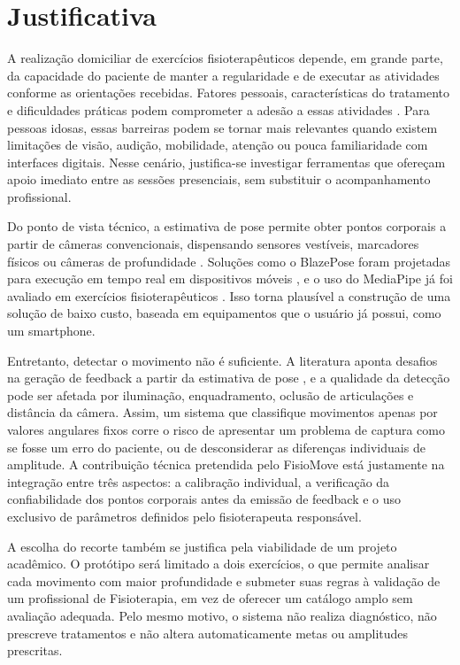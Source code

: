 
\section{Justificativa}
\label{sec:justificativa}

A realização domiciliar de exercícios fisioterapêuticos depende, em grande parte, da capacidade do paciente de manter a regularidade e de executar as atividades conforme as orientações recebidas. Fatores pessoais, características do tratamento e dificuldades práticas podem comprometer a adesão a essas atividades \cite{Jack2010}. Para pessoas idosas, essas barreiras podem se tornar mais relevantes quando existem limitações de visão, audição, mobilidade, atenção ou pouca familiaridade com interfaces digitais. Nesse cenário, justifica-se investigar ferramentas que ofereçam apoio imediato entre as sessões presenciais, sem substituir o acompanhamento profissional.

Do ponto de vista técnico, a estimativa de pose permite obter pontos corporais a partir de câmeras convencionais, dispensando sensores vestíveis, marcadores físicos ou câmeras de profundidade \cite{debnath2022}. Soluções como o BlazePose foram projetadas para execução em tempo real em dispositivos móveis \cite{Bazarevsky2020}, e o uso do MediaPipe já foi avaliado em exercícios fisioterapêuticos \cite{simoes2024}. Isso torna plausível a construção de uma solução de baixo custo, baseada em equipamentos que o usuário já possui, como um smartphone.

Entretanto, detectar o movimento não é suficiente. A literatura aponta desafios na geração de feedback a partir da estimativa de pose \cite{tharatipyakul2024}, e a qualidade da detecção pode ser afetada por iluminação, enquadramento, oclusão de articulações e distância da câmera. Assim, um sistema que classifique movimentos apenas por valores angulares fixos corre o risco de apresentar um problema de captura como se fosse um erro do paciente, ou de desconsiderar as diferenças individuais de amplitude. A contribuição técnica pretendida pelo FisioMove está justamente na integração entre três aspectos: a calibração individual, a verificação da confiabilidade dos pontos corporais antes da emissão de feedback e o uso exclusivo de parâmetros definidos pelo fisioterapeuta responsável.

A escolha do recorte também se justifica pela viabilidade de um projeto acadêmico. O protótipo será limitado a dois exercícios, o que permite analisar cada movimento com maior profundidade e submeter suas regras à validação de um profissional de Fisioterapia, em vez de oferecer um catálogo amplo sem avaliação adequada. Pelo mesmo motivo, o sistema não realiza diagnóstico, não prescreve tratamentos e não altera automaticamente metas ou amplitudes prescritas.

